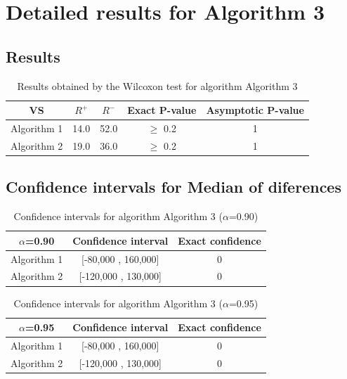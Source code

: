 \documentclass[a4paper,10pt]{article}
\begin{document}
 \clearpage 


\section{Detailed results for Algorithm 3}


\subsection{Results}

\begin{table}[!htp]
\centering\small
\begin{tabular}{
|c|c|c|c|c|}
\hline
 VS & $R^{+}$ & $R^{-}$ & Exact P-value & Asymptotic P-value \\ \hline 
Algorithm 1 & 14.0 & 52.0 & $\geq$ 0.2 & 1\\ \hline 
Algorithm 2 & 19.0 & 36.0 & $\geq$ 0.2 & 1\\ \hline 

\end{tabular}
\caption{Results obtained by the Wilcoxon test for algorithm Algorithm 3}
\end{table}

\subsection{Confidence intervals for Median of diferences}

\begin{table}[!htp]
\centering\small
\begin{tabular}{
|c|c|c|}
\hline
 $\alpha$=0.90 & Confidence interval & Exact confidence \\ \hline 
Algorithm 1 & [-80,000 , 160,000] & 0\\ \hline 
Algorithm 2 & [-120,000 , 130,000] & 0\\ \hline 

\end{tabular}
\caption{Confidence intervals for algorithm Algorithm 3 ($\alpha$=0.90)}
\end{table}
\begin{table}[!htp]
\centering\small
\begin{tabular}{
|c|c|c|}
\hline
 $\alpha$=0.95 & Confidence interval & Exact confidence \\ \hline 
Algorithm 1 & [-80,000 , 160,000] & 0\\ \hline 
Algorithm 2 & [-120,000 , 130,000] & 0\\ \hline 

\end{tabular}
\caption{Confidence intervals for algorithm Algorithm 3 ($\alpha$=0.95)}
\end{table}

 \clearpage 
\end{document}
